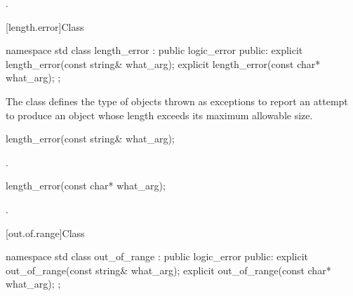 \begin{itemdescr}
\pnum
{}

\pnum
\ensures
{}.
\end{itemdescr}

[length.error]{Class }

%
\begin{codeblock}
namespace std {
  class length_error : public logic_error {
  public:
    explicit length_error(const string& what_arg);
    explicit length_error(const char* what_arg);
  };
}
\end{codeblock}

\pnum
The class
defines the type of objects thrown as exceptions
to report an attempt to produce
an object whose length exceeds its maximum allowable size.

%
\begin{itemdecl}
length_error(const string& what_arg);
\end{itemdecl}

\begin{itemdescr}
\pnum
{}

\pnum
\ensures
{}.
\end{itemdescr}

%
\begin{itemdecl}
length_error(const char* what_arg);
\end{itemdecl}

\begin{itemdescr}
\pnum
{}

\pnum
\ensures
{}.
\end{itemdescr}

[out.of.range]{Class }

%
\begin{codeblock}
namespace std {
  class out_of_range : public logic_error {
  public:
    explicit out_of_range(const string& what_arg);
    explicit out_of_range(const char* what_arg);
  };
}
\end{codeblock}

